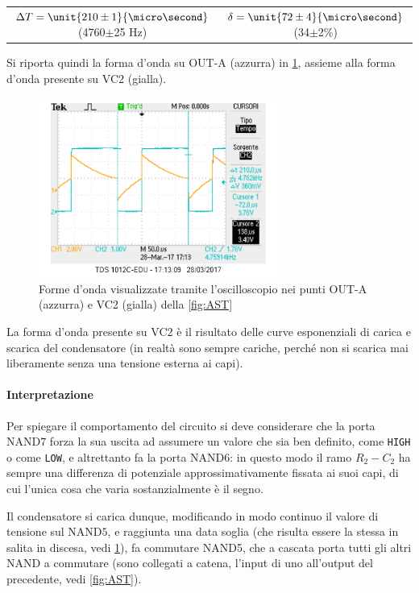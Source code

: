 \documentclass[a4paper,10pt]{article}
\def\code#1{\texttt{#1}}
\begin{document}
\begin{table}[H]
	\centering
	\begin{tabular}{cc}
		$\Delta T = \unit{210 \pm 1}{\micro\second}$ (4760$\pm$25 Hz) & $\delta = \unit{72 \pm 4}{\micro\second}$ (34$\pm$2\%)\\
	\end{tabular}
\end{table}

Si riporta quindi la forma d'onda su OUT-A (azzurra) in \cref{fig:ASTosc}, assieme alla forma d'onda presente su VC$2$ (gialla).

\begin{figure}[H]
	\centering
	\includegraphics[width=0.7\textwidth]{../grafici/astabileOSC.png}
	\caption{Forme d'onda visualizzate tramite l'oscilloscopio nei punti OUT-A  (azzurra) e VC2 (gialla) della \cref{fig:AST}}
	\label{fig:ASTosc}
\end{figure}

La forma d'onda presente su VC$2$ è il risultato delle curve esponenziali di carica e scarica del condensatore (in realtà sono sempre cariche, perché non si scarica mai liberamente senza una tensione esterna ai capi).

\paragraph{Interpretazione} Per spiegare il comportamento del circuito si deve considerare che la porta NAND$7$ forza la sua uscita ad assumere un valore che sia ben definito, come \code{HIGH} o come \code{LOW}, e altrettanto fa la porta NAND$6$: in questo modo il ramo $R_2-C_2$ ha sempre una differenza di potenziale approssimativamente fissata ai suoi capi, di cui l'unica cosa che varia sostanzialmente è il segno.

Il condensatore si carica dunque, modificando in modo continuo il valore di tensione sul NAND$5$, e raggiunta una data soglia (che risulta essere la stessa in salita in discesa, vedi \cref{fig:ASTosc}), fa commutare NAND5, che a cascata porta tutti gli altri NAND a commutare (sono collegati a catena, l'input di uno all'output del precedente, vedi \cref{fig:AST}).
\end{document}

